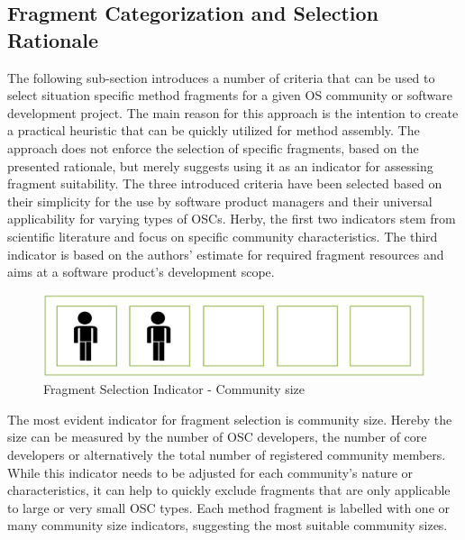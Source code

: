 \documentclass[final,5p,times,twocolumn]{elsarticle}
\begin{document}
\subsection{Fragment Categorization and Selection Rationale}
The following sub-section introduces a number of criteria that can be used to select situation specific method fragments for a given OS community or software development project. The main reason for this approach is the intention to create a practical heuristic that can be quickly utilized for method assembly. The approach does not enforce the selection of specific fragments, based on the presented rationale, but merely suggests using it as an indicator for assessing fragment suitability. The three introduced criteria have been selected based on their simplicity for the use by software product managers and their universal applicability for varying types of OSCs. Herby, the first two indicators stem from scientific literature and focus on specific community characteristics. The third indicator is based on the authors’ estimate for required fragment resources and aims at a software product's development scope.

\begin{figure}[htp]
\begin{center}
\includegraphics[scale=0.15]{figures/situational_factor_community_size.PNG}
\caption{Fragment Selection Indicator - ­Community size}
\label{fig:ratio_community_soze}
\end{center}
\end{figure}
The most evident indicator for fragment selection is community size. Hereby the size can be measured by the number of OSC developers, the number of core developers or alternatively the total number of registered community members. While this indicator needs to be adjusted for each community's nature or characteristics, it can help to quickly exclude fragments that are only applicable to large or very small OSC types. Each method fragment is labelled with one or many community size indicators, suggesting the most suitable community sizes.
\end{document}
